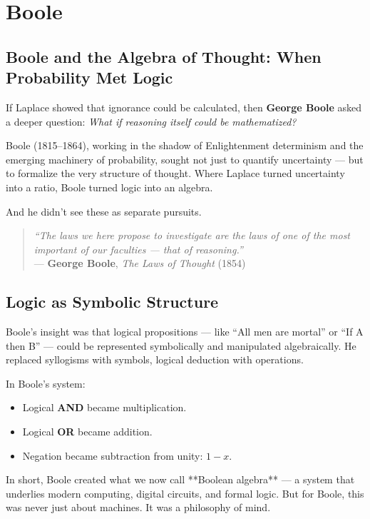 \section{Boole}

\subsection{Boole and the Algebra of Thought: When Probability Met Logic}

If Laplace showed that ignorance could be calculated, then \textbf{George Boole} asked a deeper question:  
\textit{What if reasoning itself could be mathematized?}

Boole (1815–1864), working in the shadow of Enlightenment determinism and the emerging machinery of probability, sought not just to quantify uncertainty — but to formalize the very structure of thought. Where Laplace turned uncertainty into a ratio, Boole turned logic into an algebra.

And he didn’t see these as separate pursuits.

\begin{quote}
\textit{“The laws we here propose to investigate are the laws of one of the most important of our faculties — that of reasoning.”} \\
— \textbf{George Boole}, \textit{The Laws of Thought} (1854)
\end{quote}

\subsection{Logic as Symbolic Structure}

Boole’s insight was that logical propositions — like “All men are mortal” or “If A then B” — could be represented symbolically and manipulated algebraically. He replaced syllogisms with symbols, logical deduction with operations.

In Boole’s system:
\begin{itemize}
    \item Logical \textbf{AND} became multiplication.
    \item Logical \textbf{OR} became addition.
    \item Negation became subtraction from unity: \(1 - x\).
\end{itemize}

In short, Boole created what we now call **Boolean algebra** — a system that underlies modern computing, digital circuits, and formal logic. But for Boole, this was never just about machines. It was a philosophy of mind.

